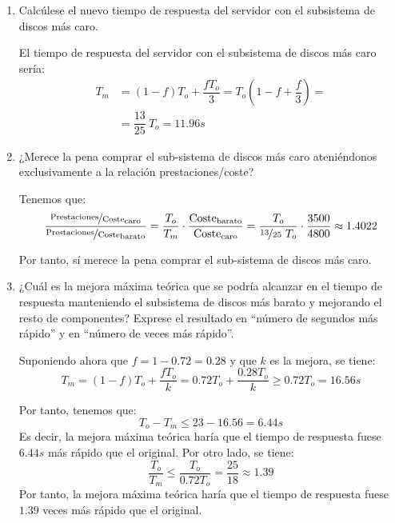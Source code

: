\begin{enumerate}
    \item Calcúlese el nuevo tiempo de respuesta del servidor con el subsistema de discos más caro.
    
    El tiempo de respuesta del servidor con el subsistema de discos más caro sería:
    \begin{align*}
        T_m &= (1-f)T_o + \dfrac{fT_o}{3} = T_o\left(1-f+\dfrac{f}{3}\right)
        =\\&= \dfrac{13}{25}\ T_o = 11.96s
    \end{align*}
    \item ¿Merece la pena comprar el sub-sistema de discos más caro ateniéndonos exclusivamente a la relación prestaciones/coste?
    
    Tenemos que:
    \begin{equation*}
        \dfrac{\nicefrac{\text{Prestaciones}}{\text{Coste}}_{\text{caro}}}{\nicefrac{\text{Prestaciones}}{\text{Coste}}_{\text{barato}}} = \dfrac{T_o}{T_m}\cdot \dfrac{\text{Coste}_{\text{barato}}}{\text{Coste}_{\text{caro}}}
        = \dfrac{T_o}{\nicefrac{13}{25}\ T_o}\cdot \dfrac{3500}{4800} \approx 1.4022
    \end{equation*}

    Por tanto, sí merece la pena comprar el sub-sistema de discos más caro.
    \item ¿Cuál es la mejora máxima teórica que se podría alcanzar en el tiempo de respuesta manteniendo el subsistema de discos más barato y mejorando el resto de componentes? Exprese el resultado en “número de segundos más rápido” y en “número de veces más rápido”.
    
    Suponiendo ahora que $f=1-0.72=0.28$ y que $k$ es la mejora, se tiene:
    \begin{equation*}
        T_m = (1-f)T_o + \dfrac{fT_o}{k} = 0.72T_o + \dfrac{0.28T_o}{k}\geq 0.72T_o=16.56s
    \end{equation*}

    Por tanto, tenemos que:
    \begin{equation*}
        T_o-T_m \leq 23-16.56 = 6.44s
    \end{equation*}
    Es decir, la mejora máxima teórica haría que el tiempo de respuesta fuese $6.44s$ más rápido que el original. Por otro lado, se tiene:
    \begin{equation*}
        \dfrac{T_o}{T_m}\leq \dfrac{T_o}{0.72T_o} = \dfrac{25}{18} \approx 1.39
    \end{equation*}
    Por tanto, la mejora máxima teórica haría que el tiempo de respuesta fuese $1.39$ veces más rápido que el original.
\end{enumerate}

